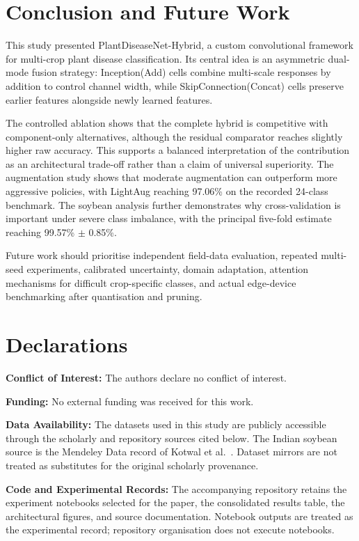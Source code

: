 \documentclass[a4paper,fleqn]{cas-dc}
\begin{document}
\section{Conclusion and Future Work}
This study presented PlantDiseaseNet-Hybrid, a custom convolutional framework for multi-crop plant disease classification. Its central idea is an asymmetric dual-mode fusion strategy: Inception(Add) cells combine multi-scale responses by addition to control channel width, while SkipConnection(Concat) cells preserve earlier features alongside newly learned features.

The controlled ablation shows that the complete hybrid is competitive with component-only alternatives, although the residual comparator reaches slightly higher raw accuracy. This supports a balanced interpretation of the contribution as an architectural trade-off rather than a claim of universal superiority. The augmentation study shows that moderate augmentation can outperform more aggressive policies, with LightAug reaching 97.06\% on the recorded 24-class benchmark. The soybean analysis further demonstrates why cross-validation is important under severe class imbalance, with the principal five-fold estimate reaching 99.57\% $\pm$ 0.85\%.

Future work should prioritise independent field-data evaluation, repeated multi-seed experiments, calibrated uncertainty, domain adaptation, attention mechanisms for difficult crop-specific classes, and actual edge-device benchmarking after quantisation and pruning.

\section*{Declarations}
\noindent\textbf{Conflict of Interest:} The authors declare no conflict of interest.

\noindent\textbf{Funding:} No external funding was received for this work.

\noindent\textbf{Data Availability:} The datasets used in this study are publicly accessible through the scholarly and repository sources cited below. The Indian soybean source is the Mendeley Data record of Kotwal et al.~\citep{kotwal2024}. Dataset mirrors are not treated as substitutes for the original scholarly provenance.

\noindent\textbf{Code and Experimental Records:} The accompanying repository retains the experiment notebooks selected for the paper, the consolidated results table, the architectural figures, and source documentation. Notebook outputs are treated as the experimental record; repository organisation does not execute notebooks.
\end{document}
